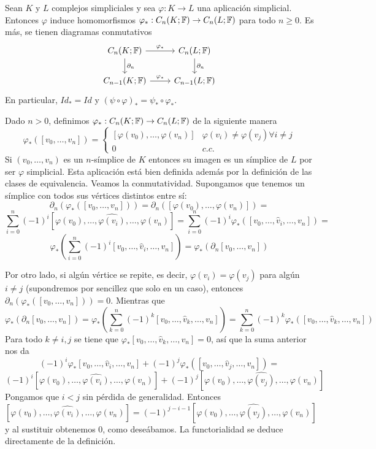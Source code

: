 \documentclass[HS.tex]{subfiles}
\begin{document}
\begin{prop}
Sean $K$ y $L$ complejos simpliciales y sea $\varphi:K\to L$ una aplicación simplicial. Entonces $\varphi$ induce homomorfismos $\varphi_*:C_n(K;\mathbb{F})\to C_n(L;\mathbb{F})$ para todo $n\geq 0$. Es más, se tienen diagramas conmutativos
\[
\begin{tikzcd}
C_n(K;\F)\arrow[r, "\varphi_*"]\arrow[d, "\partial_n"] & C_n(L;\F)\arrow[d, "\partial_n"]\\
C_{n-1}(K;\F)\arrow[r, "\varphi_*"] & C_{n-1}(L;\F)
\end{tikzcd}
\]
En particular, $Id_*=Id$ y $(\psi\circ\varphi)_*=\psi_*\circ\varphi_*$.
\end{prop}
\begin{dem}
Dado $n>0$, definimos $\varphi_*:C_n(K;\mathbb{F})\to C_n(L;\mathbb{F})$ de la siguiente manera
\[
\varphi_*([v_0,\dots, v_n])=\begin{cases}
[\varphi(v_0), \dots, \varphi(v_n)] & \varphi(v_i)\neq\varphi(v_j)\forall i\neq j\\
0& c.c.
\end{cases}
\]
Si $(v_0,\dots, v_n)$ es un $n$-símplice de $K$ entonces su imagen es un símplice de $L$ por ser $\varphi$ simplicial. Esta aplicación está bien definida además por la definición de las clases de equivalencia. Veamos la conmutatividad. Supongamos que tenemos un símplice con todos sus vértices distintos entre sí:
\[
\partial_n(\varphi_*([v_0,\dots, v_n]))=\partial_n([\varphi(v_0), \dots, \varphi(v_n)])=
\]
\[
\sum_{i=0}^n(-1)^i[\varphi(v_0), \dots,\widehat{\varphi(v_i)},\dots,  \varphi(v_n)]=\sum_{i=0}^n(-1)^i\varphi_*([v_0,\dots, \hat{v}_i,\dots, v_n])=
\]
\[
\varphi_*\left(\sum_{i=0}^n(-1)^i[v_0,\dots, \hat{v}_i,\dots, v_n]\right)=\varphi_*(\partial_n[v_0,\dots, v_n])
\]

Por otro lado, si algún vértice se repite, es decir, $\varphi(v_i)=\varphi(v_j)$ para algún $i\neq j$ (supondremos por sencillez que solo en un caso), entonces $\partial_n(\varphi_*([v_0,\dots, v_n]))=0$. Mientras que
\[
\varphi_*(\partial_n[v_0,\dots, v_n])=\varphi_*\left(\sum_{k=0}^n(-1)^k[v_0, \dots, \hat{v}_k,\dots, v_n]\right)=\sum_{k=0}^n(-1)^k\varphi_*([v_0,\dots, \hat{v}_k,\dots, v_n])
\]
Para todo $k\neq i,j$ se tiene que $\varphi_*[v_0,\dots, \hat{v}_k,\dots, v_n]=0$, así que la suma anterior nos da
\[
(-1)^i\varphi_*[v_0,\dots, \hat{v}_i,\dots, v_n]+(-1)^j\varphi_*([v_0,\dots, \hat{v}_j,\dots, v_n])=
\]
\[
(-1)^i[\varphi(v_0),\dots, \widehat{\varphi(v_i)},\dots, \varphi(v_n)]+(-1)^j[\varphi(v_0),\dots, \widehat{\varphi(v_j)},\dots, \varphi(v_n)]
\]
Pongamos que $i<j$ sin pérdida de generalidad. Entonces
\[
[\varphi(v_0),\dots, \widehat{\varphi(v_i)},\dots, \varphi(v_n)]=(-1)^{j-i-1}[\varphi(v_0),\dots, \widehat{\varphi(v_j)},\dots, \varphi(v_n)]
\]
y al sustituir obtenemos 0, como deseábamos. La functorialidad se deduce directamente de la definición.
\QED
\end{dem}
\end{document}
